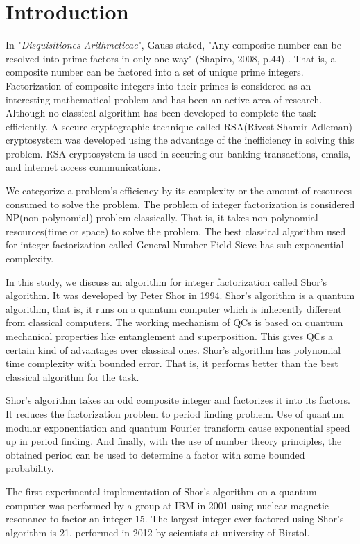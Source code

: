 \section{Introduction}
In "\textit{Disquisitiones Arithmeticae}", Gauss stated, "Any composite number can be resolved into prime factors in only one way" (Shapiro, 2008, p.44) \cite{shapiro2008introduction}. That is, a composite number can be factored into a set of unique prime integers. Factorization of composite integers into their primes is considered as an interesting mathematical problem and has been an active area of research.\cite{unique_factorization} Although no classical algorithm has been developed to complete the task efficiently. A secure cryptographic technique called RSA(Rivest-Shamir-Adleman) cryptosystem was developed using the advantage of the inefficiency in solving this problem. RSA cryptosystem is used in securing our banking transactions, emails, and internet access communications.

We categorize a problem's efficiency by its complexity or the amount of resources consumed to solve the problem. The problem of integer factorization is considered NP(non-polynomial) problem classically. That is, it takes non-polynomial resources(time or space) to solve the problem. The best classical algorithm used for integer factorization called General Number Field Sieve has sub-exponential complexity. 

In this study, we discuss an algorithm for integer factorization called Shor's algorithm. It was developed by Peter Shor in 1994.\cite{shor1994} Shor's algorithm is a quantum algorithm, that is, it runs on a quantum computer which is inherently different from classical computers. The working mechanism of QCs is based on quantum mechanical properties like entanglement and superposition. This gives QCs a certain kind of advantages over classical ones. Shor's algorithm has polynomial time complexity with bounded error. That is, it performs better than the best classical algorithm for the task.

 Shor's algorithm takes an odd composite integer and factorizes it into its factors. It reduces the factorization problem to period finding problem. Use of quantum modular exponentiation and quantum Fourier transform cause exponential speed up in period finding.\cite{van2005fast} And finally, with the use of number theory principles, the obtained period can be used to determine a factor with some bounded probability.

The first experimental implementation of Shor's algorithm on a quantum computer was performed by a group at IBM in 2001 using nuclear magnetic resonance to factor an integer 15. \cite{vandersypen2001experimental} The largest integer ever factored using  Shor's algorithm is 21, performed in 2012 by scientists at university of Birstol.\cite{martin2012experimental}